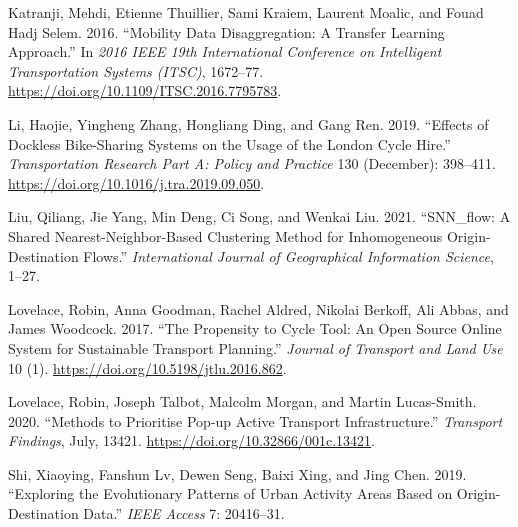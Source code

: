\documentclass[
]{article}
\newlength{\cslhangindent}
\newlength{\cslentryspacingunit} %
\newenvironment{CSLReferences}[2] %
 {%
  \setlength{\parindent}{0pt}
  \ifodd #1
  \let\oldpar\par
  \def\par{\hangindent=\cslhangindent\oldpar}
  \fi
  \setlength{\parskip}{#2\cslentryspacingunit}
 }%
 {}
\begin{document}
\begin{CSLReferences}{1}{0}
\leavevmode{}%
Katranji, Mehdi, Etienne Thuillier, Sami Kraiem, Laurent Moalic, and Fouad Hadj Selem. 2016. {``Mobility Data Disaggregation: A Transfer Learning Approach.''} In \emph{2016 {IEEE} 19th {International Conference} on {Intelligent Transportation Systems} ({ITSC})}, 1672--77. \url{https://doi.org/10.1109/ITSC.2016.7795783}.

\leavevmode{}%
Li, Haojie, Yingheng Zhang, Hongliang Ding, and Gang Ren. 2019. {``Effects of Dockless Bike-Sharing Systems on the Usage of the {London Cycle Hire}.''} \emph{Transportation Research Part A: Policy and Practice} 130 (December): 398--411. \url{https://doi.org/10.1016/j.tra.2019.09.050}.

\leavevmode{}%
Liu, Qiliang, Jie Yang, Min Deng, Ci Song, and Wenkai Liu. 2021. {``{SNN}\_flow: A Shared Nearest-Neighbor-Based Clustering Method for Inhomogeneous Origin-Destination Flows.''} \emph{International Journal of Geographical Information Science}, 1--27.

\leavevmode{}%
Lovelace, Robin, Anna Goodman, Rachel Aldred, Nikolai Berkoff, Ali Abbas, and James Woodcock. 2017. {``The {Propensity} to {Cycle Tool}: An Open Source Online System for Sustainable Transport Planning.''} \emph{Journal of Transport and Land Use} 10 (1). \url{https://doi.org/10.5198/jtlu.2016.862}.

\leavevmode{}%
Lovelace, Robin, Joseph Talbot, Malcolm Morgan, and Martin Lucas-Smith. 2020. {``Methods to {Prioritise Pop}-up {Active Transport Infrastructure}.''} \emph{Transport Findings}, July, 13421. \url{https://doi.org/10.32866/001c.13421}.

\leavevmode{}%
Shi, Xiaoying, Fanshun Lv, Dewen Seng, Baixi Xing, and Jing Chen. 2019. {``Exploring the Evolutionary Patterns of Urban Activity Areas Based on Origin-Destination Data.''} \emph{IEEE Access} 7: 20416--31.

\end{CSLReferences}
\end{document}
